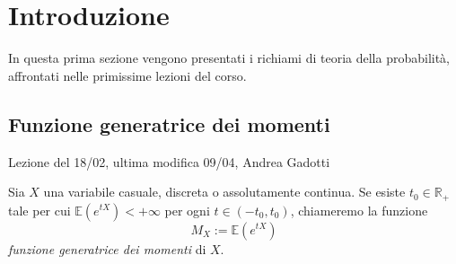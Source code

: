 \chapter{Introduzione}
In questa prima sezione vengono presentati i richiami di teoria della probabilità, affrontati nelle primissime lezioni del corso.

\section{Funzione generatrice dei momenti}
Lezione del 18/02, ultima modifica 09/04, Andrea Gadotti

\begin{dfn}[fgm]
Sia \(X\) una variabile casuale, discreta o assolutamente continua.
Se esiste $t_0 \in \mathbb{R}_{+}$ tale per cui \(\mathbb{E}(e^{tX}) < +\infty\) per ogni \(t \in (-t_0 , t_0)\), chiameremo la funzione 
\begin{equation}
  M_X := \mathbb{E}(e^{tX})
\end{equation}
\emph{funzione generatrice dei momenti} di \(X\).
\end{dfn}

